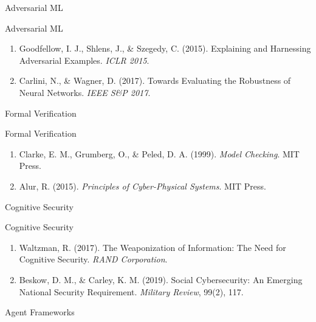 \documentclass[
  ignorenonframetext,
]{beamer}
\begin{document}
\begin{frame}[allowframebreaks]{Adversarial ML}
\protect{}\label{adversarial-ml}
\end{frame}

\begin{frame}[allowframebreaks]{Adversarial ML}
\begin{enumerate}
\item
  Goodfellow, I. J., Shlens, J., \& Szegedy, C. (2015). Explaining and
  Harnessing Adversarial Examples. \emph{ICLR 2015}.
\item
  Carlini, N., \& Wagner, D. (2017). Towards Evaluating the Robustness
  of Neural Networks. \emph{IEEE S\&P 2017}.
\end{enumerate}
\end{frame}

\begin{frame}[allowframebreaks]{Formal Verification}
\protect{}\label{formal-verification}
\end{frame}

\begin{frame}[allowframebreaks]{Formal Verification}
\begin{enumerate}
\item
  Clarke, E. M., Grumberg, O., \& Peled, D. A. (1999). \emph{Model
  Checking}. MIT Press.
\item
  Alur, R. (2015). \emph{Principles of Cyber-Physical Systems}. MIT
  Press.
\end{enumerate}
\end{frame}

\begin{frame}[allowframebreaks]{Cognitive Security}
\protect{}\label{cognitive-security}
\end{frame}

\begin{frame}[allowframebreaks]{Cognitive Security}
\begin{enumerate}
\item
  Waltzman, R. (2017). The Weaponization of Information: The Need for
  Cognitive Security. \emph{RAND Corporation}.
\item
  Beskow, D. M., \& Carley, K. M. (2019). Social Cybersecurity: An
  Emerging National Security Requirement. \emph{Military Review}, 99(2),
  117.
\end{enumerate}
\end{frame}

\begin{frame}[allowframebreaks]{Agent Frameworks}
\protect{}\label{agent-frameworks}
\end{frame}
\end{document}
